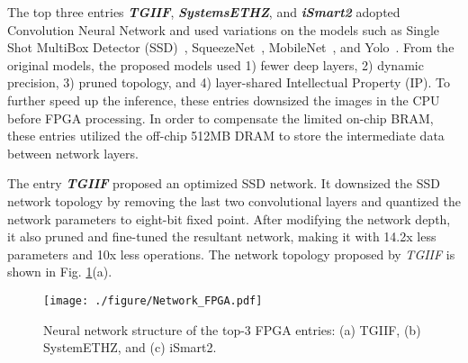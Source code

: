 \documentclass[10pt,journal,compsoc]{IEEEtran}
\begin{document}
The top three entries \emph{\textbf{TGIIF}}, \textit{\textbf{SystemsETHZ}}, and \textbf{\textit{iSmart2}} adopted Convolution Neural Network and used variations on the models such as Single Shot MultiBox Detector (SSD)~\cite{liu2016ssd}, SqueezeNet~\cite{iandola2016squeezenet}, MobileNet~\cite{howard2017mobilenets}, and Yolo~\cite{redmon2016you}.
From the original models, the proposed models used 1) fewer deep layers, 2) dynamic precision, 3) pruned topology, and 4) layer-shared Intellectual Property (IP).
To further speed up the inference, these entries downsized the images in the CPU before FPGA processing.
In order to compensate the limited on-chip BRAM, these entries utilized the off-chip 512MB DRAM to store the intermediate data between network layers.

The entry \emph{\textbf{TGIIF}} proposed an optimized SSD network.
It downsized the SSD network topology by removing the last two convolutional layers and quantized the network parameters to eight-bit fixed point.
After modifying the network depth, it also pruned and fine-tuned the resultant network, making it with 14.2x less parameters and 10x less operations.
The network topology proposed by \emph{{TGIIF}} is shown in Fig. \ref{fig:Network_FPGA}(a).

\begin{figure}%
\centering
  \texttt{[image: ./figure/Network\_FPGA.pdf]}
  \caption{Neural network structure of the top-3 FPGA entries: (a) TGIIF, (b) SystemETHZ, and (c) iSmart2.}
  \label{fig:Network_FPGA}
\end{figure}



\end{document}
